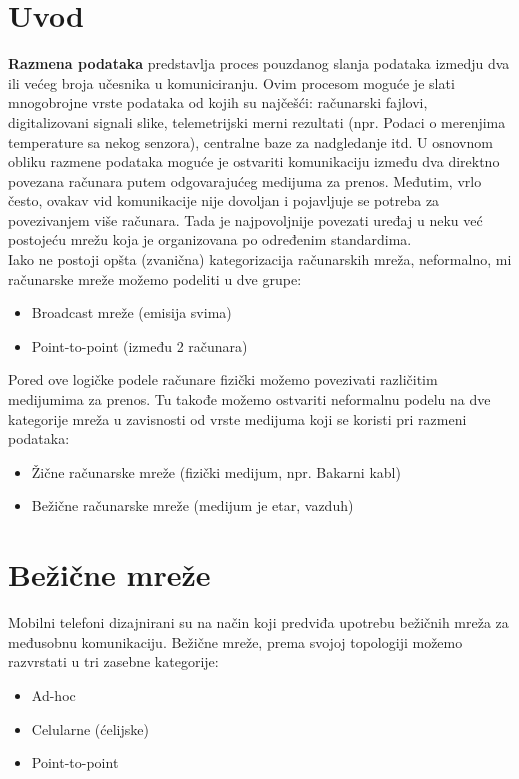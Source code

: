 \documentclass[a4paper]{article}
\begin{document}
\section{Uvod}
\label{sec:uvod}
\textbf{Razmena podataka} predstavlja proces pouzdanog slanja podataka izmedju dva ili većeg broja učesnika u komuniciranju. Ovim procesom moguće je slati mnogobrojne vrste podataka od kojih su najčešći: računarski fajlovi, digitalizovani signali slike, telemetrijski merni rezultati (npr. Podaci o merenjima temperature sa nekog senzora), centralne baze za nadgledanje itd.
U osnovnom obliku razmene podataka moguće je ostvariti komunikaciju između dva direktno povezana računara putem odgovarajućeg medijuma za prenos. Međutim, vrlo često, ovakav vid komunikacije nije dovoljan i pojavljuje se potreba za povezivanjem više računara. Tada je najpovoljnije povezati uređaj u neku već postojeću mrežu koja je organizovana po određenim standardima.\cite{racunarskeMreze} \\
Iako ne postoji opšta (zvanična) kategorizacija računarskih mreža, neformalno, mi računarske mreže možemo podeliti u dve grupe:
\begin{itemize}
\item Broadcast mreže (emisija svima)
\item Point-to-point (između 2 računara)
\end{itemize} 
Pored ove logičke podele računare fizički možemo povezivati različitim medijumima za prenos. Tu takođe možemo ostvariti neformalnu podelu na dve kategorije mreža u zavisnosti od vrste medijuma koji se koristi pri razmeni podataka:
\begin{itemize}
\item Žične računarske mreže (fizički medijum, npr. Bakarni kabl)
\item Bežične računarske mreže (medijum je etar, vazduh)
\end{itemize} 

\section{Bežične mreže}
Mobilni telefoni dizajnirani su na način koji predviđa upotrebu bežičnih mreža za međusobnu komunikaciju. Bežične mreže, prema svojoj topologiji možemo razvrstati u tri zasebne kategorije:
\begin{itemize}
\item Ad-hoc
\item Celularne (ćelijske)
\item Point-to-point
\end{itemize} 
\end{document}
